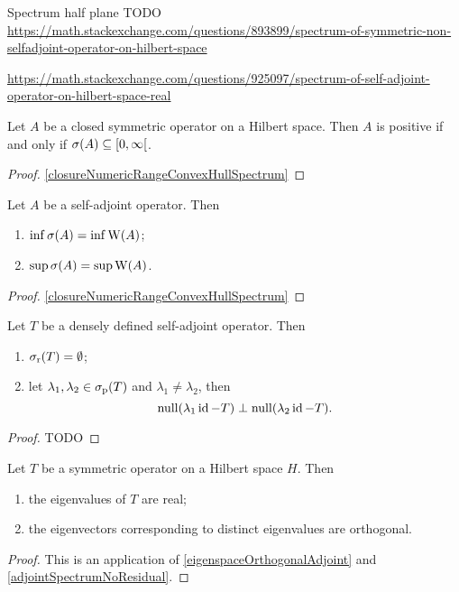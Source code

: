 \begin{example}
Spectrum half plane TODO \url{https://math.stackexchange.com/questions/893899/spectrum-of-symmetric-non-selfadjoint-operator-on-hilbert-space}

\url{https://math.stackexchange.com/questions/925097/spectrum-of-self-adjoint-operator-on-hilbert-space-real}
\end{example}

\begin{proposition}
Let $A$ be a closed symmetric operator on a Hilbert space. Then $A$ is positive \textup{if and only if} $\sigma(A)\subseteq [0,\infty[$.
\end{proposition}
\begin{proof}
\ref{closureNumericRangeConvexHullSpectrum}
\end{proof}

\begin{proposition}
Let $A$ be a self-adjoint operator. Then
\begin{enumerate}
\item $\inf \sigma(A) = \inf\operatorname{W}(A)$;
\item $\sup \sigma(A) = \sup\operatorname{W}(A)$.
\end{enumerate}
\end{proposition}
\begin{proof}
\ref{closureNumericRangeConvexHullSpectrum}
\end{proof}

\begin{proposition}
Let $T$ be a densely defined self-adjoint operator. Then
\begin{enumerate}
\item $\sigma_\text{r}(T) = \emptyset$;
\item let $\lambda_1,\lambda_2 \in \sigma_\text{p}(T)$ and $\lambda_1\neq \lambda_2$, then 
\[ \operatorname{null}(\lambda_1\operatorname{id} - T) \perp \operatorname{null}(\lambda_2 \operatorname{id} - T). \]
\end{enumerate}
\end{proposition}
\begin{proof}
TODO
\end{proof}


\begin{proposition}
Let $T$ be a symmetric operator on a Hilbert space $H$. Then
\begin{enumerate}
\item the eigenvalues of $T$ are real;
\item the eigenvectors corresponding to distinct eigenvalues are orthogonal.
\end{enumerate}
\end{proposition}
\begin{proof}
This is an application of \ref{eigenspaceOrthogonalAdjoint} and \ref{adjointSpectrumNoResidual}.
\end{proof}

